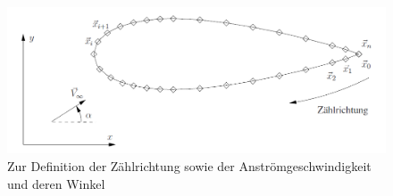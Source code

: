 \begin{figure}
\begin{center} \includegraphics[scale=0.7]{figures/zaehlrichtung.png} \end{center}
\caption{Zur Definition der Zählrichtung sowie der Anströmgeschwindigkeit und deren Winkel}
\label{fig:zaehlrichtung}
\end{figure}

